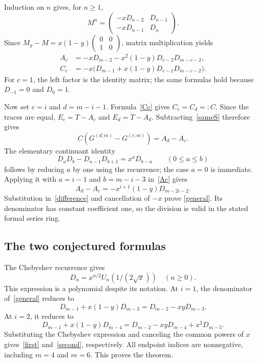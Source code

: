 \documentclass[11pt]{article}
\newcommand{\G}[1]{G^{(#1;m)}}
\begin{document}
Induction on $n$ gives, for $n\geq1$,
\[
 M^n=\begin{pmatrix}-xD_{n-2}&D_{n-1}\\-xD_{n-1}&D_n\end{pmatrix}.
\]
Since $M_y-M=x(1-y)\left(\begin{smallmatrix}0&0\\1&0\end{smallmatrix}\right)$,
matrix multiplication yields
\begin{align}
 A_c&=-xD_{m-2}-x^2(1-y)D_{c-2}D_{m-c-2},\label{Ac}\\
 C_c&=-x\bigl(D_{m-1}+x(1-y)D_{c-1}D_{m-c-2}\bigr).\label{Cc}
\end{align}
For $c=1$, the left factor is the identity matrix; the same formulas
hold because $D_{-1}=0$ and $D_0=1$.

Now set $c=i$ and $d=m-i-1$. Formula~\eqref{Cc} gives $C_c=C_d=:C$.
Since the traces are equal, $E_c=T-A_c$ and $E_d=T-A_d$.
Subtracting~\eqref{sameS} therefore gives
\begin{equation}\label{difference}
 C(\G d-\G c)=A_d-A_c.
\end{equation}
The elementary continuant identity
\begin{equation}\label{continuant}
 D_aD_b-D_{a-1}D_{b+1}=x^aD_{b-a}\qquad(0\leq a\leq b)
\end{equation}
follows by reducing $a$ by one using the recurrence; the case $a=0$
is immediate. Applying it with $a=i-1$ and $b=m-i-3$ in~\eqref{Ac} gives
\[
 A_d-A_c=-x^{i+1}(1-y)D_{m-2i-2}.
\]
Substitution in~\eqref{difference} and cancellation of $-x$ prove
\eqref{general}. Its denominator has constant coefficient one, so the
division is valid in the stated formal series ring.

\subsection*{The two conjectured formulas}
The Chebyshev recurrence gives
\[
 D_n=x^{n/2}U_n(1/(2\sqrt x))\quad(n\geq0).
\]
This expression is a polynomial despite its notation. At $i=1$, the
denominator of~\eqref{general} reduces to
\[
 D_{m-1}+x(1-y)D_{m-3}=D_{m-2}-xyD_{m-3}.
\]
At $i=2$, it reduces to
\[
 D_{m-1}+x(1-y)D_{m-4}
 =D_{m-2}-xyD_{m-4}+x^2D_{m-5}.
\]
Substituting the Chebyshev expression and canceling the common powers
of $x$ gives~\eqref{first} and~\eqref{second}, respectively. All endpoint
indices are nonnegative, including $m=4$ and $m=6$. This proves the theorem.
\end{document}
